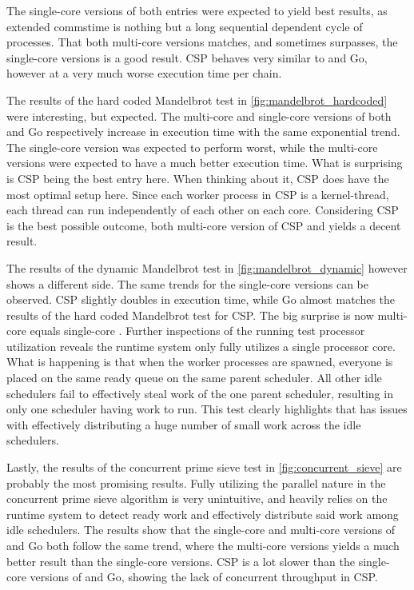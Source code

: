 The single\hyp{}core versions of both entries were expected to yield best results, as extended commstime is nothing but a long sequential dependent cycle of processes. That both multi\hyp{}core versions matches, and sometimes surpasses, the single\hyp{}core versions is a good result. \Cpp{}CSP behaves very similar to \Proxc{} and Go, however at a very much worse execution time per chain. 

The results of the hard coded Mandelbrot test in \cref{fig:mandelbrot_hardcoded} were interesting, but expected. The multi\hyp{}core and single\hyp{}core versions of both \Proxc{} and Go respectively increase in execution time with the same exponential trend. The single\hyp{}core version was expected to perform worst, while the multi\hyp{}core versions were expected to have a much better execution time. What is surprising is \Cpp{}CSP being the best entry here. When thinking about it, \Cpp{}CSP does have the most optimal setup here. Since each worker process in \Cpp{}CSP is a kernel\hyp{}thread, each thread can run independently of each other on each core. Considering \Cpp{}CSP is the best possible outcome, both multi\hyp{}core version of \Cpp{}CSP and \Proxc{} yields a decent result.

The results of the dynamic Mandelbrot test in \cref{fig:mandelbrot_dynamic} however shows a different side. The same trends for the single\hyp{}core versions can be observed. \Cpp{}CSP slightly doubles in execution time, while Go almost matches the results of the hard coded Mandelbrot test for \Cpp{}CSP. The big surprise is now multi\hyp{}core \Proxc{} equals single\hyp{}core \Proxc{}. Further inspections of the running test processor utilization reveals the runtime system only fully utilizes a single processor core. What is happening is that when the worker processes are spawned, everyone is placed on the same ready queue on the same parent scheduler. All other idle schedulers fail to effectively steal work of the one parent scheduler, resulting in only one scheduler having work to run. This test clearly highlights that \Proxc{} has issues with effectively distributing a huge number of small work across the idle schedulers.

Lastly, the results of the concurrent prime sieve test in \cref{fig:concurrent_sieve} are probably the most promising results. Fully utilizing the parallel nature in the concurrent prime sieve algorithm is very unintuitive, and heavily relies on the runtime system to detect ready work and effectively distribute said work among idle schedulers. The results show that the single\hyp{}core and multi\hyp{}core versions of \Proxc{} and Go both follow the same trend, where the multi\hyp{}core versions yields a much better result than the single\hyp{}core versions. \Cpp{}CSP is a lot slower than the single\hyp{}core versions of \Proxc{} and Go, showing the lack of concurrent throughput in \Cpp{}CSP. 

